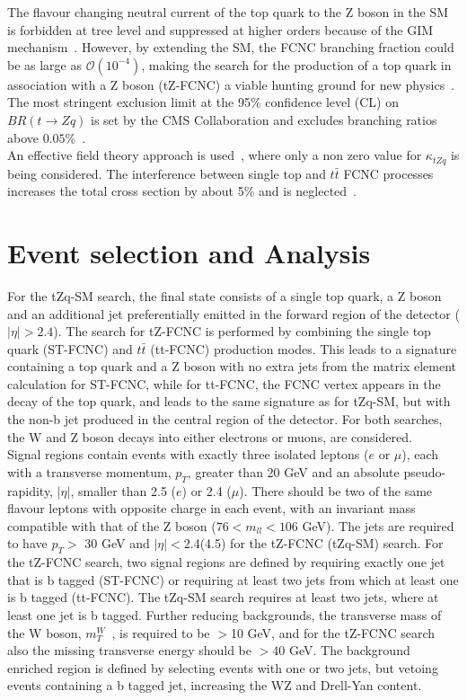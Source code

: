 \documentclass[12pt]{article}
\def\tt{t\bar{t}}
\def\mT{$m_T^W$}
\begin{document}
The flavour changing neutral current of the top quark to the Z boson in the SM is forbidden at tree level and suppressed at higher orders because of the GIM mechanism~\cite{17}. However, by extending the SM, the FCNC branching fraction could be as large as $\mathcal{O}(10^{-4})$, making the search for the production of a top quark in association with a Z boson (tZ-FCNC) a viable hunting ground  for new physics~\cite{21}. 
The most stringent exclusion limit at the 95$\%$ confidence level (CL) on $BR(t \rightarrow Zq)$ is set by the CMS Collaboration and excludes branching ratios above $0.05 \%$~\cite{29}.\\
An effective field theory approach is used~\cite{23}, where only a non zero value for $\kappa_{tZq}$ is being considered.
The interference between single top and $\tt$ FCNC processes increases the total cross section by about 5\% and is neglected~\cite{paper}.


\section{Event selection and Analysis}
For the tZq-SM search, the final state consists of a single top quark, a Z boson and an additional jet preferentially emitted in the forward region of the detector ($|\eta| > 2.4$). The search for tZ-FCNC is performed by combining the single top quark (ST-FCNC) and $\tt$ (tt-FCNC) production modes. This leads to a signature containing a top quark and a Z boson with no extra jets from the matrix element calculation for ST-FCNC, while for tt-FCNC, the FCNC vertex appears in the decay of the top quark, and leads to the same signature as for tZq-SM, but with the non-b jet produced in the central region of the detector. For both searches, the W  and Z boson decays into either electrons or muons, are considered.\\

Signal regions contain events with exactly three isolated leptons ($e$ or $\mu$),  each with a  transverse momentum, $p_T$, greater than 20 GeV and an absolute pseudo-rapidity, $|\eta|$,  smaller than 2.5 ($e$) or 2.4 ($\mu$). There should be two of the same flavour leptons with opposite charge in each event, with an invariant mass  compatible with that of the Z boson ($76< m_{ll} < 106$ GeV). The jets  are required to have $p_T>$ 30 GeV and $|\eta|<$2.4(4.5) for the tZ-FCNC (tZq-SM) search.  For the tZ-FCNC search, two signal regions are defined by requiring exactly one jet that is b tagged (ST-FCNC) or requiring at least two jets from which at least one is b tagged (tt-FCNC). The tZq-SM search requires at least two jets, where at least one jet is b tagged. 
Further reducing backgrounds, the transverse mass of the W boson, \mT\ , is required to be $>$10 GeV, and for the tZ-FCNC search also the missing transverse energy should be $>$40 GeV. 
The background enriched region is defined by selecting events with one or two jets, but vetoing events containing a b tagged jet, increasing the WZ and Drell-Yan  content. \\
\end{document}
